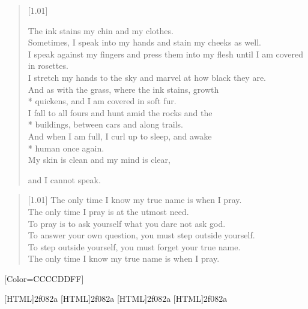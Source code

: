 \begin{paracol}{2}
\begin{verse}[1.01\textwidth]
{    The ink stains my chin and my clothes.\\
    \vin Sometimes, I speak into my hands and stain my cheeks as well.\\
    \vin \vin I speak against my fingers and press them into my flesh until I am covered in rosettes.\\
    \vin \vin \vin I stretch my hands to the sky and marvel at how black they are.\\
    \vin \vin \vin \vin And as with the grass, where the ink stains, growth\\*
    \vin \vin \vin \vin quickens, and I am covered in soft fur.\\
    \vin \vin \vin \vin \vin I fall to all fours and hunt amid the rocks and the\\*
    \vin \vin \vin \vin \vin buildings, between cars and along trails.\\
    \vin \vin \vin \vin \vin \vin And when I am full, I curl up to sleep, and awake\\*
    \vin \vin \vin \vin \vin \vin human once again.\\
    \vin \vin \vin \vin \vin \vin \vin My skin is clean and my mind is clear,

    and I cannot speak.}
\end{verse}
\vfill
\newpage

\null
\vfill
\begin{verse}[1.01\textwidth]
    The only time I know my true name is when I pray.\\
    The only time I pray is at the utmost need.\\
    To pray is to ask yourself what you dare not ask god.\\
    To answer your own question, you must step outside yourself.\\
    To step outside yourself, you must forget your true name.\\
    The only time I know my true name is when I pray.
\end{verse}
\vfill
\flushpage
\end{paracol}


\renewfontfamily{}[Color=CCCCDDFF]

[HTML]{2f082a}
[HTML]{2f082a}
[HTML]{2f082a}
[HTML]{2f082a}

